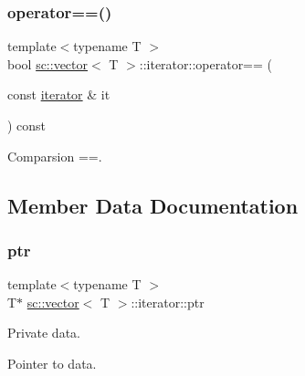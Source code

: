 \mbox{\label{classsc_1_1vector_1_1iterator_ab635a96af6c0bcc3fe888e2568287df1}} 
\subsubsection{\texorpdfstring{operator==()}{operator==()}}
{\footnotesize\ttfamily template$<$typename T $>$ \\
bool \hyperlink{classsc_1_1vector}{sc\+::vector}$<$ T $>$\+::iterator\+::operator== (\begin{DoxyParamCaption}\item[{const \hyperlink{classsc_1_1vector_1_1iterator}{iterator} \&}]{it }\end{DoxyParamCaption}) const\hspace{0.3cm}{\ttfamily [inline]}}



Comparsion ==. 



\subsection{Member Data Documentation}
\mbox{\label{classsc_1_1vector_1_1iterator_a8f6a0c77f66fe2331b1837b341c08dc5}} 
\subsubsection{\texorpdfstring{ptr}{ptr}}
{\footnotesize\ttfamily template$<$typename T $>$ \\
T$\ast$ \hyperlink{classsc_1_1vector}{sc\+::vector}$<$ T $>$\+::iterator\+::ptr\hspace{0.3cm}{\ttfamily [private]}}



Private data. 

Pointer to data. 